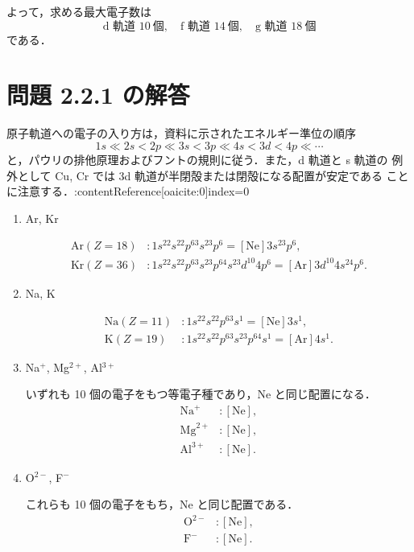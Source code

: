 \documentclass[a4paper,12pt]{jlreq}
\begin{document}
よって，求める最大電子数は
\[
\boxed{\text{d 軌道 }10\ \text{個},\quad \text{f 軌道 }14\ \text{個},\quad
       \text{g 軌道 }18\ \text{個}}
\]
である．

\section*{問題 2.2.1 の解答}

原子軌道への電子の入り方は，資料に示されたエネルギー準位の順序  
\[
1s\ll 2s<2p\ll 3s<3p\ll 4s<3d<4p\ll\cdots
\]
と，パウリの排他原理およびフントの規則に従う．また，d 軌道と s 軌道の
例外として Cu, Cr では 3d 軌道が半閉殻または閉殻になる配置が安定である
ことに注意する．:contentReference[oaicite:0]{index=0}

\begin{enumerate}
  \item Ar, Kr

  \begin{align*}
    \mathrm{Ar}(Z=18)&: 1s^22s^22p^63s^23p^6 = [\mathrm{Ne}]3s^23p^6,\\
    \mathrm{Kr}(Z=36)&: 1s^22s^22p^63s^23p^64s^23d^{10}4p^6
                      = [\mathrm{Ar}]3d^{10}4s^24p^6.
  \end{align*}

  \item Na, K

  \begin{align*}
    \mathrm{Na}(Z=11)&: 1s^22s^22p^63s^1 = [\mathrm{Ne}]3s^1,\\
    \mathrm{K}(Z=19)&: 1s^22s^22p^63s^23p^64s^1 = [\mathrm{Ar}]4s^1.
  \end{align*}

  \item Na$^+$, Mg$^{2+}$, Al$^{3+}$

  いずれも 10 個の電子をもつ等電子種であり，Ne と同じ配置になる．
  \begin{align*}
    \mathrm{Na}^+ &: [\mathrm{Ne}],\\
    \mathrm{Mg}^{2+} &: [\mathrm{Ne}],\\
    \mathrm{Al}^{3+} &: [\mathrm{Ne}].
  \end{align*}

  \item O$^{2-}$, F$^-$

  これらも 10 個の電子をもち，Ne と同じ配置である．
  \begin{align*}
    \mathrm{O}^{2-} &: [\mathrm{Ne}],\\
    \mathrm{F}^- &: [\mathrm{Ne}].
  \end{align*}


\end{enumerate}
\end{document}
